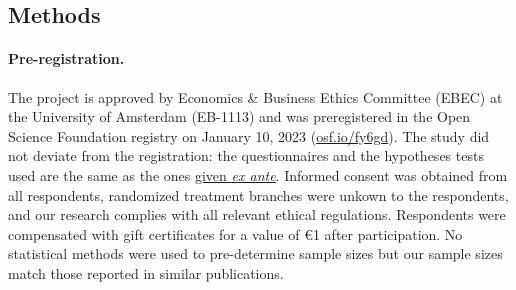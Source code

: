   \begin{small} %
\section*{\normalsize Methods}\label{sec:methods} %

\paragraph{\small Pre-registration.}
The project is approved by Economics \& Business Ethics Committee (EBEC) at the University of Amsterdam (EB-1113) and %
was preregistered in the Open Science Foundation registry on January 10, 2023 (\href{https://osf.io/fy6gd}{osf.io/fy6gd}). The study did not deviate from the registration: the questionnaires and the hypotheses tests used are the same as the ones \href{https://osf.io/2b6vq}{given \textit{ex ante}}. Informed consent was obtained from all respondents, randomized treatment branches were unkown to the respondents, and our research complies with all relevant ethical regulations. Respondents were compensated with gift certificates for a value of \euro{}1 after participation. No statistical methods were used to pre-determine sample sizes but our sample sizes match those reported in similar publications.\citep{dechezlepretre_fighting_nodate,issp_international_2010,beiser-mcgrath_could_2019,sivonen_attitudes_2022,douenne_yellow_2022}


\end{small}
